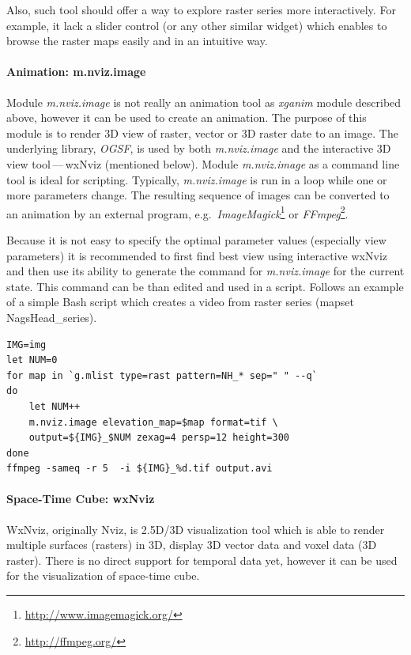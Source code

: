 \documentclass[a4paper,12pt,oneside]{book}
\newcommand{\module}[1]{\textsl{#1}}
\newcommand{\dash}{\mbox{\,---\,}}
\begin{document}
Also, such tool should offer a way to explore raster series more interactively.
For example, it lack a slider control (or any other similar widget)
which enables to browse the raster maps easily and in an intuitive way.


\paragraph{Animation: m.nviz.image}
Module \module{m.nviz.image} is not really an animation tool as \module{xganim} module described above,
however it can be used to create an animation.
The purpose of this module is to render 3D view of raster, vector or 3D raster date to an image.
The underlying library, \emph{OGSF}, is used by both \module{m.nviz.image}
and the interactive 3D view tool\dash wxNviz (mentioned below).
Module \module{m.nviz.image} as a command line tool is ideal for scripting.
Typically, \module{m.nviz.image} is run in a loop while one or more parameters change.
The resulting sequence of images can be converted to an animation by an external program,
e.g.\ \emph{ImageMagick}\footnote{\url{http://www.imagemagick.org/}} or
\emph{FFmpeg}\footnote{\url{http://ffmpeg.org/}}.

Because it is not easy to specify the optimal parameter values
(especially view parameters) it is recommended to first find best view using interactive
wxNviz and then use its ability to generate the command for \module{m.nviz.image} for the current state.
This command can be than edited and used in a script.
Follows an example of a simple Bash script which creates a video from raster series (mapset NagsHead\_series).


\begin{small}
\begin{lstlisting}[style=mybash]
IMG=img
let NUM=0
for map in `g.mlist type=rast pattern=NH_* sep=" " --q`
do
    let NUM++
    m.nviz.image elevation_map=$map format=tif \
    output=${IMG}_$NUM zexag=4 persp=12 height=300
done
ffmpeg -sameq -r 5  -i ${IMG}_%d.tif output.avi
\end{lstlisting}
\end{small}



\paragraph{Space-Time Cube: wxNviz}
WxNviz, originally Nviz, is 2.5D/3D visualization tool which is able to render
multiple surfaces (rasters) in 3D, display 3D vector data and voxel data (3D raster).
There is no direct support for temporal data yet, however it can be 
used for the visualization of space-time cube.
\end{document}
